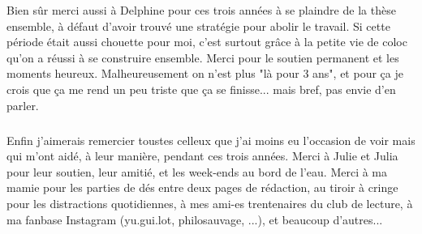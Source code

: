 Bien sûr merci aussi à Delphine pour ces trois années à se plaindre de la thèse ensemble, à défaut d'avoir trouvé une stratégie pour abolir le travail. Si cette période était aussi chouette pour moi, c'est surtout grâce à la petite vie de coloc qu'on a réussi à se construire ensemble. Merci pour le soutien permanent et les moments heureux. Malheureusement on n'est plus "là pour 3 ans", et pour ça je crois que ça me rend un peu triste que ça se finisse... mais bref, pas envie d'en parler.

\subparagraph{}Enfin j'aimerais remercier toustes celleux que j'ai moins eu l'occasion de voir mais qui m'ont aidé, à leur manière, pendant ces trois années. Merci à Julie et Julia pour leur soutien, leur amitié, et les week-ends au bord de l'eau. Merci à ma mamie pour les parties de dés entre deux pages de rédaction, au tiroir à cringe pour les distractions quotidiennes, à mes ami-es trentenaires du club de lecture, à ma fanbase Instagram (yu.gui.lot, philosauvage, ...), et beaucoup d'autres...

\thispagestyle{empty}